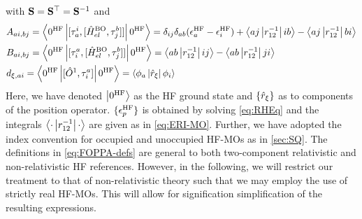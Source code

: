 with $\mathbf{S} = \mathbf{S}^\top = \mathbf{S}^{-1}$ and
\begin{subequations}
  \label{eq:FOPPA-defs}
\begin{align}
  &A_{ai,bj} = \left\langle 0^{\mathrm{HF}} \left\vert [\tau^i_a,[\hat{H}^{\mathrm{BO}}_{el}, \tau_j^b]] \right\vert 0^{\mathrm{HF}} \right\rangle = 
    \delta_{ij}\delta_{ab}(\epsilon^{\mathrm{HF}}_a - \epsilon^{\mathrm{HF}}_i) + \left\langle aj \left\vert r_{12}^{-1} \right\vert ib \right\rangle - \left\langle aj \left\vert r_{12}^{-1} \right\vert bi \right\rangle \\
  &B_{ai,bj} = \left\langle 0^{\mathrm{HF}} \left\vert [\tau^a_i,[\hat{H}^{\mathrm{BO}}_{el}, \tau_j^b]] \right\vert 0^{\mathrm{HF}} \right\rangle = 
    \left\langle ab \left\vert r_{12}^{-1} \right\vert ij \right\rangle - \left\langle ab \left\vert r_{12}^{-1} \right\vert ji \right\rangle \\
  &d_{\xi,ai} = \left\langle 0^{\mathrm{HF}} \left\vert [\hat{O}^1,\tau^{a}_i] \right\vert 0^{\mathrm{HF}} \right\rangle = \left\langle \phi_a \left\vert \hat{r}_\xi  \right\vert \phi_i \right\rangle
\end{align}
\end{subequations}
Here, we have denoted $\left\vert 0^{\mathrm{HF}} \right\rangle$ as the HF ground state and $\{\hat{r}_\xi\}$ as to components of the position
operator. $\{\epsilon^{\mathrm{HF}}_p\}$ is obtained by solving \cref{eq:RHEq} and the integrals $\left\langle \cdot \left\vert r^{-1}_{12} \right\vert \cdot \right\rangle$
are given as in \cref{eq:ERI-MO}. Further, we have adopted the index convention for occupied and unoccupied HF-MOs
as in \cref{sec:SQ}. The definitions in \cref{eq:FOPPA-defs} are general to both two-component relativistic and 
non-relativistic HF references. However, in the following, we will restrict our treatment to that of non-relativistic theory
such that we may employ the use of strictly real HF-MOs. This will allow for signification simplification of the resulting
expressions.


